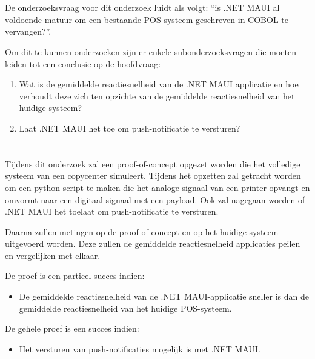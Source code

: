 \section{}%
\label{sec:onderzoeksvraag}

De onderzoeksvraag voor dit onderzoek luidt als volgt: ``is .NET MAUI al voldoende matuur om een bestaande POS-systeem geschreven in COBOL te vervangen?''.

Om dit te kunnen onderzoeken zijn er enkele subonderzoeksvragen die moeten leiden tot een conclusie op de hoofdvraag:

\begin{enumerate}  
    \item Wat is de gemiddelde reactiesnelheid van de .NET MAUI applicatie en hoe verhoudt deze zich ten opzichte van de gemiddelde reactiesnelheid van het huidige systeem?
    
    \item Laat .NET MAUI het toe om push-notificatie te versturen?
\end{enumerate}

\section{}%
\label{sec:onderzoeksdoelstelling}

Tijdens dit onderzoek zal een proof-of-concept opgezet worden die het volledige systeem van een copycenter simuleert. Tijdens het opzetten zal getracht worden om een python script te maken die het analoge signaal van een printer opvangt en omvormt naar een digitaal signaal met een payload. Ook zal nagegaan worden of .NET MAUI het toelaat om push-notificatie te versturen.

Daarna zullen metingen op de proof-of-concept en op het huidige systeem uitgevoerd worden. Deze zullen de gemiddelde reactiesnelheid applicaties peilen en vergelijken met elkaar.

De proef is een partieel succes indien:
\begin{itemize}
    \item De gemiddelde reactiesnelheid van de .NET MAUI-applicatie sneller is dan de gemiddelde reactiesnelheid van het huidige POS-systeem.
\end{itemize}

De gehele proef is een succes indien:

\begin{itemize}
    \item Het versturen van push-notificaties mogelijk is met .NET MAUI.
\end{itemize}


